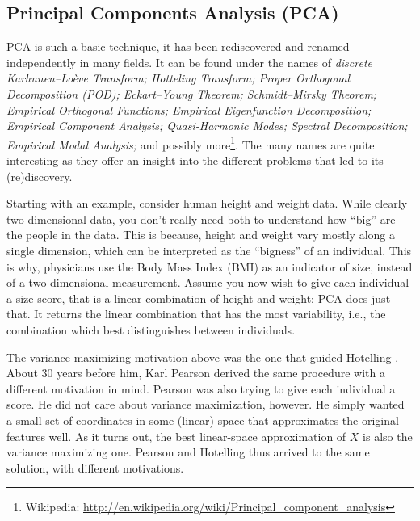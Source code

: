 \subsection{Principal Components Analysis (PCA)}
\label{sec:pca}


PCA is such a basic technique, it has been rediscovered and renamed independently in many fields. 
It can be found under the names of \emph{discrete Karhunen–Loève Transform; Hotteling Transform; Proper Orthogonal Decomposition (POD); Eckart–Young Theorem; Schmidt–Mirsky Theorem;  Empirical Orthogonal Functions; Empirical Eigenfunction Decomposition;  Empirical Component Analysis;  Quasi-Harmonic Modes;  Spectral Decomposition;  Empirical Modal Analysis;} and possibly more\footnote{Wikipedia: \url{http://en.wikipedia.org/wiki/Principal_component_analysis} }.
The many names are quite interesting as they offer an insight into the different problems that led to its (re)discovery.

Starting with an example, consider human height and weight data. 
While clearly two dimensional data, you don't really need both to understand how ``big'' are the people in the data. 
This is because, height and weight vary mostly along a single dimension, which can be interpreted as the ``bigness'' of an individual. 
This is why, physicians use the Body Mass Index (BMI) as an indicator of size, instead of a two-dimensional measurement.
Assume you now wish to give each individual a size score, that is a linear combination of height and weight: PCA does just that. It returns the linear combination that has the most variability, i.e., the combination which best distinguishes between individuals. 

The variance maximizing motivation above was the one that guided Hotelling \citep{hotelling_analysis_1933}.
About $30$ years before him, Karl Pearson \citep{pearson_liii._1901} derived the same procedure with a different motivation in mind. Pearson was also trying to give each individual a score. He did not care about variance maximization, however. He simply wanted a small set of coordinates in some (linear) space that approximates the original features well. As it turns out, the best linear-space approximation of $X$ is also the variance maximizing one. Pearson and Hotelling thus arrived to the same solution, with different motivations. 





